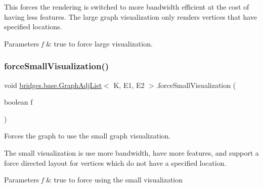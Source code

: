 This forces the rendering is switched to more bandwidth efficient at the cost of having less features. The large graph visualization only renders vertices that have specified locations.


\begin{DoxyParams}{Parameters}
{\em f} & true to force large visualization. \\
\hline
\end{DoxyParams}
\mbox{\label{classbridges_1_1base_1_1_graph_adj_list_ae14e51214742db0c4dab26c1d409f4ed}} 
\subsubsection{\texorpdfstring{force\+Small\+Visualization()}{forceSmallVisualization()}}
{\footnotesize\ttfamily void \mbox{\hyperlink{classbridges_1_1base_1_1_graph_adj_list}{bridges.\+base.\+Graph\+Adj\+List}}$<$ K, E1, E2 $>$.force\+Small\+Visualization (\begin{DoxyParamCaption}\item[{boolean}]{f }\end{DoxyParamCaption})}



Forces the graph to use the small graph visualization. 

The small visualization is use more bandwidth, have more features, and support a force directed layout for vertices which do not have a specified location.


\begin{DoxyParams}{Parameters}
{\em f} & true to force using the small visualization \\
\hline
\end{DoxyParams}
\mbox{\label{classbridges_1_1base_1_1_graph_adj_list_a77771e356aa8bf44525be9ae01603989}} 
